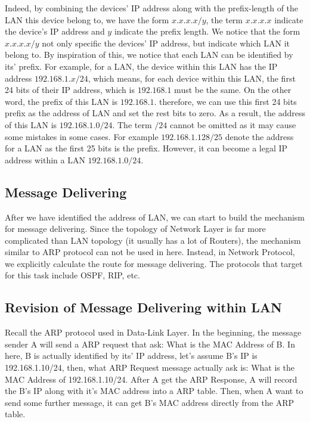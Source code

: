 \documentclass[10pt,a4paper]{article}
\begin{document}
Indeed, by combining the devices' IP address along with the prefix-length of the LAN this device belong to, we have the form $x.x.x.x/y$, the term $x.x.x.x$ indicate the device's IP address and $y$ indicate the prefix length. We notice that the form $x.x.x.x/y$ not only specific the devices' IP address, but indicate which LAN it belong to. By inspiration of this, we notice that each LAN can be identified by its' prefix. For example, for a LAN, the device within this LAN has the IP address $192.168.1.x/24$, which means, for each device within this LAN, the first 24 bits of their IP address, which is $192.168.1$ must be the same. On the other word, the prefix of this LAN is $192.168.1$. therefore, we can use this first 24 bits prefix as the address of LAN and set the rest bits to zero. As a result, the address of this LAN is $192.168.1.0/24$. The term $/24$ cannot be omitted as it may cause some mistakes in some cases. For example $192.168.1.128/25$ denote the address for a LAN as the first 25 bits is the prefix. However, it can become a legal IP address within a LAN $192.168.1.0/24$.

\subsection{Message Delivering}
After we have identified the address of LAN, we can start to build the mechanism for message delivering. Since the topology of Network Layer is far more complicated than LAN topology (it usually has a lot of Routers), the mechanism similar to ARP protocol can not be used in here. Instead, in Network Protocol, we explicitly calculate the route for message delivering. The protocols that target for this task include OSPF, RIP, etc.

\subsection{Revision of Message Delivering within LAN}
Recall the ARP protocol used in Data-Link Layer. In the beginning, the message sender A will send a ARP request that ask: What is the MAC Address of B. In here, B is actually identified by its' IP address, let's assume B's IP is 192.168.1.10/24, then, what ARP Request message actually ask is: What is the MAC Address of 192.168.1.10/24. After A get the ARP Response, A will record the B's IP along with it's MAC address into a ARP table. Then, when A want to send some further message, it can get B's MAC address directly from the ARP table.
\end{document}
